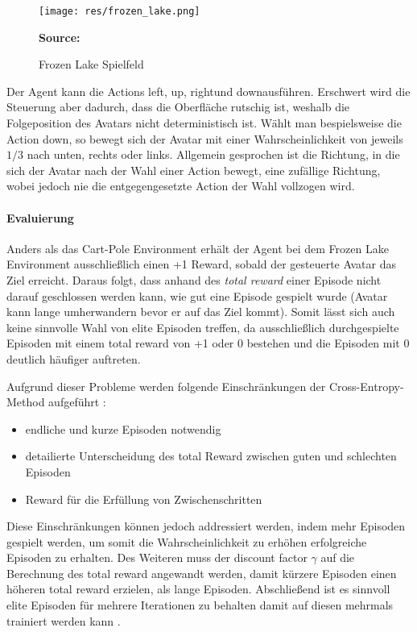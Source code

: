 \documentclass[11pt]{scrartcl}
\newcommand{\source}[1]{\vspace{-5pt} \caption*{\hfill \textbf{Source:} {#1}} }
\begin{document}
\begin{figure}[htp]
\centering
\texttt{[image: res/frozen\_lake.png]}
\caption{Frozen Lake Spielfeld}
\source{\cite[~S.90 - Chapter 4 - Figure 5]{L2018}}
\label{fig:frozen_lake}
\end{figure}

\noindent
Der Agent kann die Actions \grqq left\grqq, \grqq up\grqq, \grqq right\grqq und \grqq
down\grqq ausführen. Erschwert wird die Steuerung aber dadurch, dass die Oberfläche
rutschig ist, weshalb die Folgeposition des Avatars nicht deterministisch ist.
Wählt man bespielsweise die Action \grqq down\grqq, so bewegt sich der Avatar mit einer
Wahrscheinlichkeit von jeweils $1/3$ nach unten, rechts oder links. Allgemein gesprochen
ist die Richtung, in die sich der Avatar nach der Wahl einer Action bewegt, eine zufällige
Richtung, wobei jedoch nie die entgegengesetzte Action der Wahl vollzogen wird.


\paragraph*{Evaluierung}
\noindent
\newline
Anders als das Cart-Pole Environment erhält der Agent bei dem Frozen Lake Environment 
ausschließlich einen +1 Reward, sobald der gesteuerte Avatar das Ziel erreicht. Daraus folgt,
dass anhand des \textit{total reward} einer Episode nicht darauf geschlossen werden kann,
wie gut eine Episode gespielt wurde (Avatar kann lange umherwandern bevor er auf das Ziel kommt).
Somit lässt sich auch keine sinnvolle Wahl von elite Episoden treffen, da ausschließlich
durchgespielte Episoden mit einem total reward von +1 oder 0 bestehen und die Episoden mit 0
deutlich häufiger auftreten.

Aufgrund dieser Probleme werden folgende Einschränkungen der Cross-Entropy-Method 
aufgeführt \cite[~S.92 f.]{L2018}:
\begin{itemize}
\itemsep0pt
\item endliche und kurze Episoden notwendig
\item detailierte Unterscheidung des total Reward zwischen guten und schlechten Episoden
\item Reward für die Erfüllung von Zwischenschritten
\end{itemize}

Diese Einschränkungen können jedoch addressiert werden, indem mehr Episoden gespielt werden, 
um somit die Wahrscheinlichkeit zu erhöhen erfolgreiche Episoden zu erhalten. Des Weiteren
muss der discount factor $\gamma$ auf die Berechnung des total reward angewandt werden, damit
kürzere Episoden einen höheren total reward erzielen, als lange Episoden. Abschließend ist es
sinnvoll elite Episoden für mehrere Iterationen zu behalten damit auf diesen mehrmals
trainiert werden kann \cite[~S.93]{L2018}.  
\end{document}
